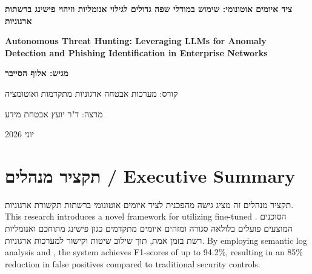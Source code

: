 \documentclass[11pt,a4paper]{article}
\begin{document}
\begin{titlepage}
\centering
\vspace*{1.5cm}
{\Huge\bfseries ציד איומים אוטונומי: שימוש במודלי שפה גדולים לגילוי אנומליות וזיהוי פישינג ברשתות ארגוניות \par}
\vspace{1cm}
{\Large\bfseries Autonomous Threat Hunting: Leveraging LLMs for Anomaly Detection and Phishing Identification in Enterprise Networks \par}
\vspace{2cm}
{\large\bfseries מגיש: אלוף הסייבר \par}
\vspace{0.8cm}
{\large קורס: מערכות אבטחה ארגוניות מתקדמות ואוטומציה \par}
\vspace{0.8cm}
{\large מרצה: ד"ר יועץ אבטחת מידע \par}
\vspace{2cm}
{\large יוני 2026 \par}
\end{titlepage}

\thispagestyle{empty}
\setcounter{page}{2}


\tableofcontents
\newpage




\section{תקציר מנהלים / Executive Summary}
תקציר מנהלים זה מציג גישה מהפכנית לציד איומים אוטונומי ברשתות תקשורת ארגוניות.
This research introduces a novel framework for  utilizing fine-tuned .
הסוכנים המוצעים פועלים בלולאה סגורה ומזהים איומים מתקדמים כגון פישינג מתוחכם ואנומליות רשת בזמן אמת, תוך שילוב שיטות  וקישור למערכות  ארגוניות.
By employing semantic log analysis and , the system achieves F1-scores of up to 94.2\%, resulting in an 85\% reduction in false positives compared to traditional security controls.
\end{document}

